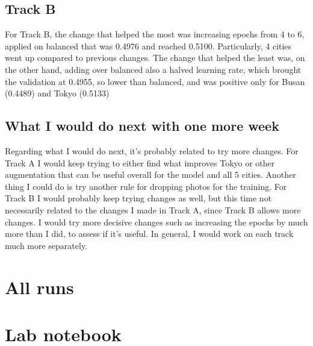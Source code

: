 \documentclass[11pt]{article}
\begin{document}
\subsection*{Track B}
For Track B, the change that helped the most was increasing epochs from 4 to 6, applied on balanced that was 0.4976 and reached 0.5100. Particularly, 4 cities went up compared to previous changes. The change that helped the least was, on the other hand, adding over balanced also a halved learning rate, which brought the validation at 0.4955, so lower than balanced, and was positive only for Busan (0.4489) and Tokyo (0.5133)

\subsection*{What I would do next with one more week}
Regarding what I would do next, it's probably related to try more changes. For Track A I would keep trying to either find what improves Tokyo or other augmentation that can be useful overall for the model and all 5 cities. Another thing I could do is try another rule for dropping photos for the training. For Track B I would probably keep trying changes as well, but this time not necessarily related to the changes I made in Track A, since Track B allows more changes. I would try more decisive changes such as increasing the epochs by much more than I did, to assess if it's useful. In general, I would work on each track much more separately.

\section*{All runs}

\section*{Lab notebook}
\end{document}
